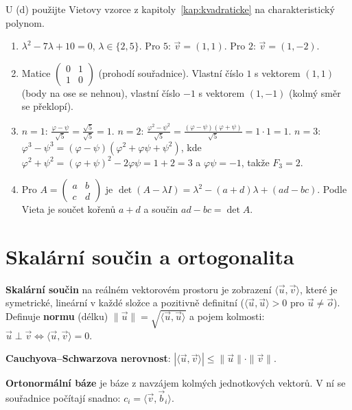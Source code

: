 \begin{hint}
  U (d) použijte Vietovy vzorce z kapitoly~\ref{kap:kvadraticke} na charakteristický polynom.
\end{hint}

\begin{solution}
  \begin{enumerate}[label=(\alph*)]
    \item $\lambda^2 - 7\lambda + 10 = 0$, $\lambda\in\{2, 5\}$. Pro $5$: $\vec{v} = (1, 1)$. Pro $2$: $\vec{v} = (1, -2)$.
    \item Matice $\begin{pmatrix} 0 & 1\\ 1 & 0\end{pmatrix}$ (prohodí souřadnice). Vlastní číslo $1$ s vektorem $(1, 1)$ (body na ose se nehnou), vlastní číslo $-1$ s vektorem $(1, -1)$ (kolmý směr se překlopí).
    \item $n = 1$: $\frac{\varphi - \psi}{\sqrt{5}} = \frac{\sqrt{5}}{\sqrt{5}} = 1$. $n = 2$: $\frac{\varphi^2 - \psi^2}{\sqrt{5}} = \frac{(\varphi - \psi)(\varphi + \psi)}{\sqrt{5}} = 1\cdot 1 = 1$. $n = 3$: $\varphi^3 - \psi^3 = (\varphi - \psi)(\varphi^2 + \varphi\psi + \psi^2)$, kde $\varphi^2 + \psi^2 = (\varphi + \psi)^2 - 2\varphi\psi = 1 + 2 = 3$ a $\varphi\psi = -1$, takže $F_3 = 2$.
    \item Pro $A = \begin{pmatrix} a & b\\ c & d\end{pmatrix}$ je $\det(A - \lambda I) = \lambda^2 - (a + d)\lambda + (ad - bc)$. Podle Vieta je součet kořenů $a + d$ a součin $ad - bc = \det A$.
  \end{enumerate}
\end{solution}

\section{Skalární součin a ortogonalita}

\begin{definitionbox}
  \textbf{Skalární součin} na reálném vektorovém prostoru je zobrazení $\langle\vec{u}, \vec{v}\rangle$, které je symetrické, lineární v každé složce a pozitivně definitní ($\langle\vec{u}, \vec{u}\rangle > 0$ pro $\vec{u}\neq\vec{o}$). Definuje \textbf{normu} (délku) $\|\vec{u}\| = \sqrt{\langle\vec{u}, \vec{u}\rangle}$ a pojem kolmosti: $\vec{u}\perp\vec{v}\Leftrightarrow\langle\vec{u}, \vec{v}\rangle = 0$.

  \vspace{0.2cm}

  \textbf{Cauchyova--Schwarzova nerovnost}: $|\langle\vec{u}, \vec{v}\rangle|\leq\|\vec{u}\|\cdot\|\vec{v}\|$.

  \textbf{Ortonormální báze} je báze z navzájem kolmých jednotkových vektorů. V ní se souřadnice počítají snadno: $c_i = \langle\vec{v}, \vec{b}_i\rangle$.
\end{definitionbox}

